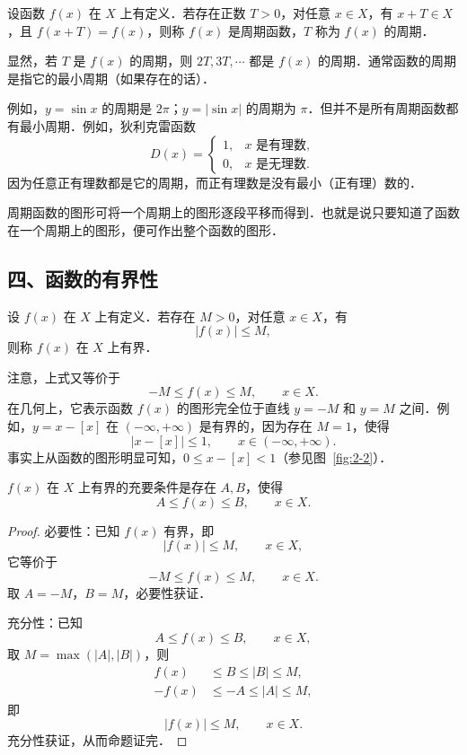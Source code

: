 \begin{definition}\label{def:2-4}
设函数 $f(x)$ 在 $X$ 上有定义．若存在正数 $T>0$，对任意 $x\in X$，有 $x+T\in X$，且 $f(x+T)=f(x)$，则称 $f(x)$ 是周期函数，$T$ 称为 $f(x)$ 的周期．
\end{definition}

显然，若 $T$ 是 $f(x)$ 的周期，则 $2T,3T,\cdots$ 都是 $f(x)$ 的周期．通常函数的周期是指它的最小周期（如果存在的话）．

例如，$y=\sin x$ 的周期是 $2\pi$；$y=|\sin x|$ 的周期为 $\pi$．但并不是所有周期函数都有最小周期．例如，狄利克雷函数
\[
D(x)=\begin{cases}
1, & x\text{ 是有理数},\\
0, & x\text{ 是无理数}.
\end{cases}
\]
因为任意正有理数都是它的周期，而正有理数是没有最小（正有理）数的．

周期函数的图形可将一个周期上的图形逐段平移而得到．也就是说只要知道了函数在一个周期上的图形，便可作出整个函数的图形．

\subsection*{四、函数的有界性}

\begin{definition}\label{def:2-5}
设 $f(x)$ 在 $X$ 上有定义．若存在 $M>0$，对任意 $x\in X$，有
\[
|f(x)|\leqslant M,
\]
则称 $f(x)$ 在 $X$ 上有界．
\end{definition}

注意，上式又等价于
\[
-M\leqslant f(x)\leqslant M,\qquad x\in X.
\]
在几何上，它表示函数 $f(x)$ 的图形完全位于直线 $y=-M$ 和 $y=M$ 之间．例如，$y=x-[x]$ 在 $(-\infty,+\infty)$ 是有界的，因为存在 $M=1$，使得
\[
|x-[x]|\leqslant 1,\qquad x\in(-\infty,+\infty).
\]
事实上从函数的图形明显可知，$0\leqslant x-[x]<1$（参见图~\ref{fig:2-2}）．

\begin{proposition}\label{prop:2-1}
$f(x)$ 在 $X$ 上有界的充要条件是存在 $A,B$，使得
\[
A\leqslant f(x)\leqslant B,\qquad x\in X.
\]
\end{proposition}

\begin{proof}
必要性：已知 $f(x)$ 有界，即
\[
|f(x)|\leqslant M,\qquad x\in X,
\]
它等价于
\[
-M\leqslant f(x)\leqslant M,\qquad x\in X.
\]
取 $A=-M$，$B=M$，必要性获证．

充分性：已知
\[
A\leqslant f(x)\leqslant B,\qquad x\in X,
\]
取 $M=\max(|A|,|B|)$，则
\[
\begin{aligned}
f(x) &\leqslant B\leqslant |B|\leqslant M,\\
-f(x) &\leqslant -A\leqslant |A|\leqslant M,
\end{aligned}
\]
即
\[
|f(x)|\leqslant M,\qquad x\in X.
\]
充分性获证，从而命题证完．
\end{proof}

